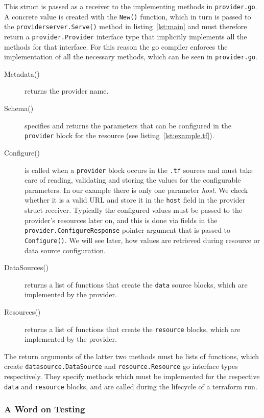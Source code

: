 \documentclass[paper=a4,11pt,numbers=noenddot]{article}
\begin{document}
This struct is passed as a receiver to the implementing methods in \verb'provider.go'. A concrete value is created with the \verb'New()' function, which in turn is passed to the \verb'providerserver.Serve()' method in listing~\ref{lst:main} and must therefore return a \verb'provider.Provider' interface type that implicitly implements all the methods for that interface. For this reason the go compiler enforces the implementation of all the necessary methods, which can be seen in \verb'provider.go'.

\begin{description}
\item[Metadata()] returns the provider name.
\item[Schema()] specifies and returns the parameters that can be configured in the \verb'provider' block for the resource (see listing~\ref{lst:example.tf}).
\item[Configure()] is called when a \verb'provider' block occurs in the \verb'.tf' sources and must take care of reading, validating and storing the values for the configurable parameters. In our example there is only one parameter \emph{host}. We check whether it is a valid URL and store it in the \verb'host' field in the provider struct receiver. Typically the configured values must be passed to the provider's resources later on, and this is done via fields in the \verb'provider.ConfigureResponse' pointer argument that is passed to \verb'Configure()'. We will see later, how values are retrieved during resource or data source configuration.
\item[DataSources()] returns a list of functions that create the \verb'data' source blocks, which are implemented by the provider.
  \item[Resources()] returns a list of functions that create the \verb'resource' blocks, which are implemented by the provider.
\end{description}

The return arguments of the latter two methods must be lists of functions, which create \verb'datasource.DataSource' and \verb'resource.Resource' go interface types respectively. They specify methods which must be implemented for the respective \verb'data' and \verb'resource' blocks, and are called during the lifecycle of a terraform run.

\subsubsection{A Word on Testing}
\label{subsubsec:note-on-testing}
\end{document}
